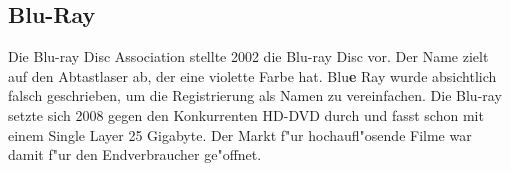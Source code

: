         \subsection{Blu-Ray}
        \label{ch:Technisch:sec:Optische Speicherung:sub:Blu-Ray}
        
            Die Blu-ray Disc Association stellte 2002 die Blu-ray Disc vor. Der Name zielt auf den Abtastlaser ab, der eine violette Farbe hat. Blu\textbf{e} Ray wurde absichtlich falsch geschrieben, um die Registrierung als Namen zu vereinfachen. Die Blu-ray setzte sich 2008 gegen den Konkurrenten HD-DVD durch und fasst schon mit einem Single Layer 25 Gigabyte. Der Markt f"ur hochaufl"osende Filme war damit f"ur den Endverbraucher ge"offnet.
            \\
           



